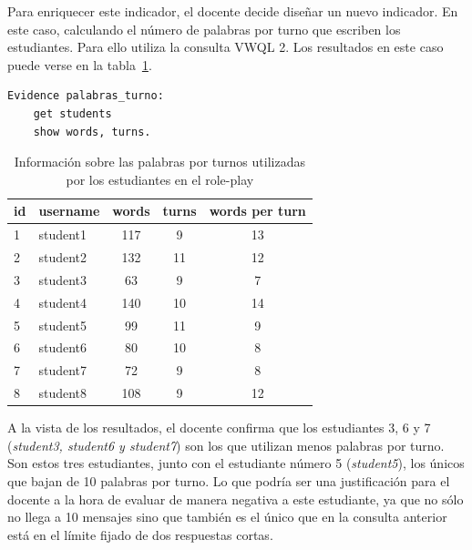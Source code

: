 			Para enriquecer este indicador, el docente decide diseñar un nuevo indicador. En este caso, calculando el número de palabras por turno que escriben los estudiantes. Para ello utiliza la consulta VWQL 2. Los resultados en este caso puede verse en la tabla~\ref{tab:EvsListEj2}.

\begin{verbatim}
Evidence palabras_turno:
    get students
    show words, turns.
\end{verbatim}

\begin{table}
	\centering
	\caption{Información sobre las palabras por turnos utilizadas por los estudiantes en el role-play}
	\label{tab:EvsListEj2}
	\begin{tabular}{|l|l|c|c|c|}
		\hline
		id & username & words & turns & words per turn \\
		\hline
		\hline
		1 & student1 & 117 & 9 & 13 \\
		\hline
		2 & student2 & 132 & 11 & 12  \\
		\hline
		3 & student3 & 63 & 9 & 7  \\
		\hline
		4 & student4 & 140 & 10 & 14  \\
		\hline
		5 & student5 & 99  & 11 & 9 \\
		\hline
		6 & student6 & 80 & 10 & 8  \\
		\hline
		7 & student7 & 72 & 9 & 8  \\
		\hline
		8 & student8 & 108 & 9 & 12   \\
		\hline
	\end{tabular}
\end{table}

			A la vista de los resultados, el docente confirma que los estudiantes 3, 6 y 7 (\emph{student3, student6 y student7}) son los que utilizan menos palabras por turno. Son estos tres estudiantes, junto con el estudiante número 5 (\emph{student5}), los únicos que bajan de 10 palabras por turno. Lo que podría ser una justificación para el docente a la hora de evaluar de manera negativa a este estudiante, ya que no sólo no llega a 10 mensajes sino que también es el único que en la consulta anterior está en el límite fijado de dos respuestas cortas.


